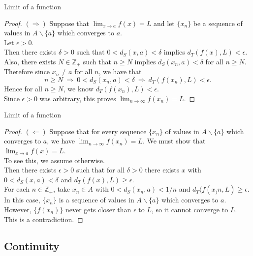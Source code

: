 \documentclass{beamer}
\begin{document}
\begin{frame}{Limit of a function}
\begin{proof}
$(\Rightarrow)$\quad
Suppose that $\lim_{x\rightarrow a} f(x) =L$ and let $\{x_n\}$ be a sequence of values in $A\backslash\{a\}$ which converges to $a$.\\
\pause
Let $\epsilon > 0$.\\
\pause
Then there exists $\delta > 0$ such that $0 < d_S(x,a) < \delta$ implies $d_T(f(x),L) < \epsilon$.\\
\pause
Also, there exists $N \in\mathbb{Z}_+$ such that $n\geq N$ implies $d_S(x_n,a) < \delta$ for all $n\geq N$.\\
\pause
Therefore since $x_n\neq a$ for all $n$, we have that
$$n\geq N\ \Rightarrow\ 0 < d_S(x_n,a) < \delta\ \Rightarrow\ d_T(f(x_n), L) < \epsilon.$$
\pause
Hence for all $n\geq N$, we know $d_T(f(x_n), L) < \epsilon$.\\
\pause
Since $\epsilon > 0$ was arbitrary, this proves $\lim_{n\rightarrow \infty} f(x_n) = L$.
\end{proof}
\end{frame}

\begin{frame}{Limit of a function}
\begin{proof}
$(\Leftarrow)$\quad
Suppose that for every sequence $\{x_n\}$ of values in $A\backslash\{a\}$ which converges to $a$, we have $\lim_{n\rightarrow \infty} f(x_n) = L$.
\pause
We must show that $\lim_{x\rightarrow a} f(x) = L$.\\
\pause
To see this, we assume otherwise.\\
\pause
Then there exists $\epsilon > 0$ such that for all $\delta > 0$ there exists $x$ with $0 < d_S(x,a) < \delta$ and $d_T(f(x),L) \geq \epsilon$.\\
\pause
For each $n\in \mathbb{Z}_+$, take $x_n\in A$ with $0 < d_S(x_n,a) < 1/n$ and $d_T(f(x_)n,L) \geq \epsilon$.\\
\pause
In this case, $\{x_n\}$ is a sequence of values in $A\backslash\{a\}$ which converges to $a$.\\
\pause
However, $\{f(x_n)\}$ never gets closer than $\epsilon$ to $L$, so it cannot converge to $L$.\\
\pause
This is a contradiction.
\end{proof}
\end{frame}

\subsection{Continuity}
\end{document}
